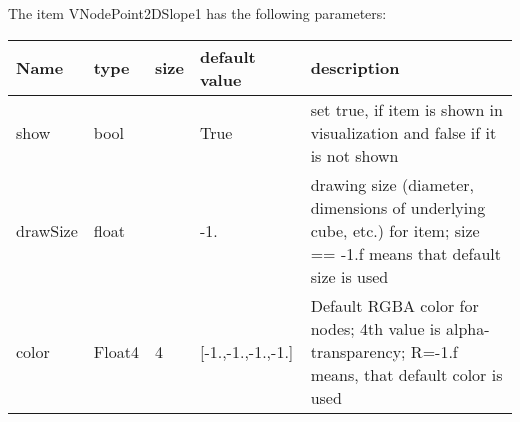 The item VNodePoint2DSlope1 has the following parameters:
\begin{center}
  \footnotesize
  \begin{longtable}{| p{4.5cm} | p{2.5cm} | p{0.5cm} | p{2.5cm} | p{6cm} |}
    \hline
    \bf Name & \bf type & \bf size & \bf default value & \bf description \\ \hline
    show &     bool &      &     True &     set true, if item is shown in visualization and false if it is not shown\\ \hline
    drawSize &     float &      &     -1. &     drawing size (diameter, dimensions of underlying cube, etc.)  for item; size == -1.f means that default size is used\\ \hline
    color &     Float4 &     4 &     [-1.,-1.,-1.,-1.] &     Default RGBA color for nodes; 4th value is alpha-transparency; R=-1.f means, that default color is used\\ \hline
	  \end{longtable}
	\end{center}


